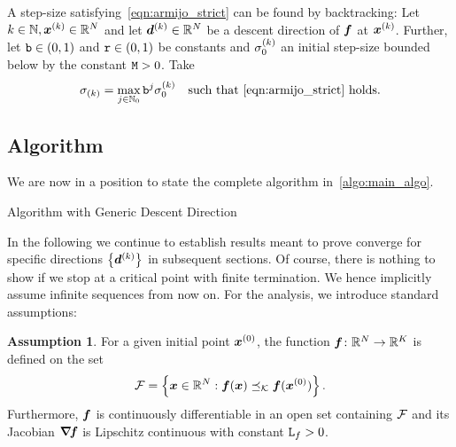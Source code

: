 \documentclass{article}
\theoremstyle{plain}
\theoremstyle{definition}
\newtheorem{assumption}{Assumption}
\begin{document}
A step-size satisfying~\eqref{eqn:armijo_strict} can be found by backtracking:
Let $k \in \mathbb N, \bm{x}^{(k)}\in \mathbb R^N$ and let $\bm{d}^{(k)}\in \mathbb R^N$ be a descent direction
of $\bm{f}$ at $\bm{x}^{(k)}$. Further, let 
$\mathtt{b} \in (0,1)$ and $\mathtt{r} \in (0,1)$ be constants and 
$\sigma^{(k)}_{0}$ an initial step-size bounded below by the constant $\mathtt{M}>0$.
Take
\begin{equation}
	\sigma_{(k)} 
	= 
		\max_{j\in \mathbb N_0} \mathtt{b}^j\sigma^{(k)}_{0}
		\quad\text{such that~\eqref{eqn:armijo_strict} holds.}
\label{eqn:backtracking_stepsize}
\end{equation}

\subsection{Algorithm}
We are now in a position to state the complete algorithm
in~\cref{algo:main_algo}.

\begin{algorithm}
	\caption{Algorithm with Generic Descent Direction}%
	\label{algo:main_algo}
\end{algorithm}

In the following we continue to establish results meant to prove converge
for specific directions $\left\{\bm{d}^{(k)}\right\}$ in subsequent sections.
Of course, there is nothing to show if we stop at a critical point 
with finite termination.
We hence implicitly assume infinite sequences from now on.
For the analysis, we introduce standard assumptions:
	
\begin{assumption}\label{ass:funcs_differentiable}
	For a given initial point $\bm{x}^{(0)}$, the function 
	$\bm{f}\colon \mathbb R^N \to \mathbb R^K$ is defined on the set
	$$
	\mathcal F = \left\{
		\bm{x} \in \mathbb R^N: \bm{f}(\bm{x}) \preceq_\mathcal K \bm{f}(\bm{x}^{(0)})
	\right\}.
	$$
	Furthermore, $\bm{f}$ is continuously differentiable in an open set 
	containing $\mathcal F$ and its Jacobian $\bm{\nabla}\!\bm{f}$ is Lipschitz continuous
	with constant $\mathtt{L}_{f} > 0$.
\end{assumption}
\end{document}
